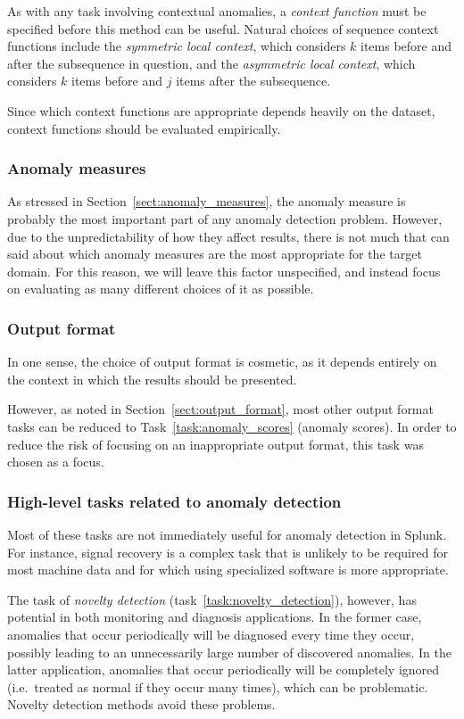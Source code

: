 As with any task involving contextual anomalies, a \emph{context function} must be specified before this method can be useful. Natural choices of sequence context functions include the \emph{symmetric local context}, which considers $k$ items before and after the subsequence in question, and the \emph{asymmetric local context}, which considers $k$ items before and $j$ items after the subsequence.

Since which context functions are appropriate depends heavily on the dataset, context functions should be evaluated empirically.

\subsubsection{Anomaly measures}

As stressed in Section~\ref{sect:anomaly_measures}, the anomaly measure is probably the most important part of any anomaly detection problem. However, due to the unpredictability of how they affect results, there is not much that can said about which anomaly measures are the most appropriate for the target domain. For this reason, we will leave this factor unspecified, and instead focus on evaluating as many different choices of it as possible.

\subsubsection{Output format}

In one sense, the choice of output format is cosmetic, as it depends entirely on the context in which the results should be presented. 

However, as noted in Section~\ref{sect:output_format}, most other output format tasks can be reduced to Task~\ref{task:anomaly_scores} (anomaly scores). In order to reduce the risk of focusing on an inappropriate output format, this task was chosen as a focus.

\subsubsection{High-level tasks related to anomaly detection}

Most of these tasks are not immediately useful for anomaly detection in Splunk. For instance, signal recovery is a complex task that is unlikely to be required for most machine data and for which using specialized software is more appropriate.

The task of \emph{novelty detection} (task~\ref{task:novelty_detection}), however, has potential in both monitoring and diagnosis applications. In the former case, anomalies that occur periodically will be diagnosed every time they occur, possibly leading to an unnecessarily large number of discovered anomalies. In the latter application, anomalies that occur periodically will be completely ignored (i.e.\ treated as normal if they occur many times), which can be problematic. Novelty detection methods avoid these problems.

